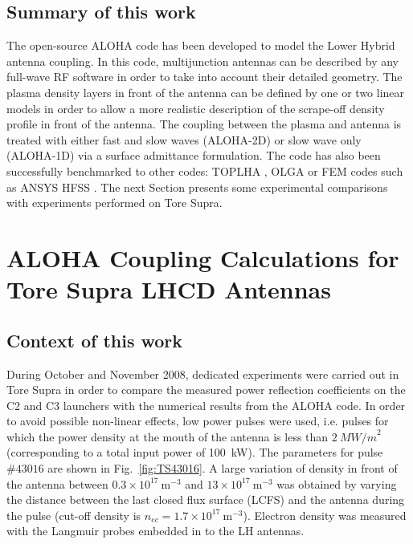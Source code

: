 \subsection{Summary of this work}
The open-source ALOHA code has been developed to model the Lower Hybrid antenna coupling. In this code, multijunction antennas can be described by any full-wave RF software in order to take into account their detailed geometry. The plasma density layers in front of the antenna can be defined by one or two linear models in order to allow a more realistic description of the scrape-off density profile in front of the antenna. The coupling between the plasma and antenna is treated with either fast and slow waves (ALOHA-2D) or slow wave only (ALOHA-1D) via a surface admittance formulation. The code has also been successfully benchmarked to other codes: TOPLHA , OLGA  or FEM codes such as ANSYS HFSS . The next Section presents some experimental comparisons with experiments performed on Tore Supra.

\clearpage

\section{ALOHA Coupling Calculations for Tore Supra LHCD Antennas}\label{sec:ALOHA_TS}
\subsection{Context of this work}
During October and November 2008, dedicated experiments were carried out in Tore Supra in order to compare the measured power reflection coefficients on the C2 and C3 launchers with the numerical results from the ALOHA code. In order to avoid possible non-linear effects\cite{petrzilka1987, ekedahl2009}, low power pulses were used, i.e. pulses for which the power density at the mouth of the antenna is less than $2~\si{MW/m}^2$ (corresponding to a total input power of 100~kW). The parameters for pulse $\#43016$ are shown in Fig.~\ref{fig:TS43016}. A large variation of density in front of the antenna between $0.3\times10^{17}~\mathrm{m}^{-3}$ and $13\times10^{17}~\mathrm{m}^{-3}$ was obtained by varying the distance between the last closed flux surface (LCFS) and the antenna during the pulse (cut-off density is $n_{ec}=1.7\times10^{17}~\mathrm{m}^{-3}$). Electron density was measured with the Langmuir probes embedded in to the LH antennas. 

